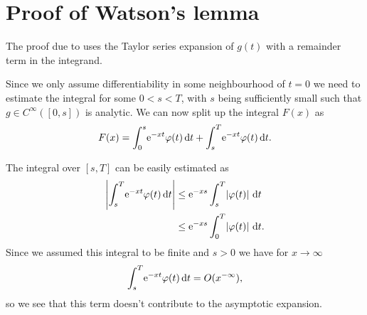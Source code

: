 \section{Proof of Watson's lemma}
\label{sec:proof-watson}
\begin{Theorem}
  
  \begin{Proof}
    The proof due to \cite{Miller2006} uses the Taylor series expansion of
    $g(t)$ with a remainder term in the integrand.

    Since we only assume differentiability in some neighbourhood of $t=0$ we
    need to estimate the integral for some $0 < s < T$, with $s$ being
    sufficiently small such that $g\in C^{\infty}([0,s])$ is analytic. We
    can now split up the integral $F(x)$ as
    \begin{align*}
      F(x) = \Integ[s]{0}{t}{\Eto{-xt}\phi(t)} +
      \Integ[T]{s}{t}{\Eto{-xt}\phi(t)}.
    \end{align*}

    The integral over $\left[s,T\right]$ can be easily estimated as
    \begin{align*}
      \Abs{\Integ[T]{s}{t}{\Eto{-xt}\phi(t)}}
      &\le \Eto{-xs} \Integ[T]{s}{t}{\Abs{\phi(t)}} \\
      &\le \Eto{-xs}\Integ[T]{0}{t}{\Abs{\phi(t)}}.
    \end{align*}
    Since we assumed this integral to be finite and $s>0$ we have for
    $x\to\infty$
    \begin{align}
      \Integ[T]st{\Eto{-xt}\phi(t)} = O(x^{-\infty}),
    \end{align}
    so we see that this term doesn't contribute to the asymptotic expansion.


\end{Proof}
\end{Theorem}

